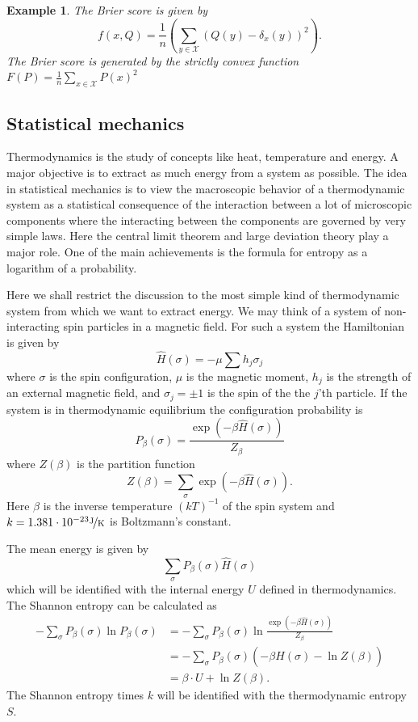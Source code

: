 \documentclass[10pt,a4paper,draft]{article}
\newtheorem{Example}{Example}
\begin{document}
\begin{Example}
The Brier score is given by 
\[
f\left(x,Q\right)=\frac{1}{n}\left(\sum_{y\in\mathcal{X}}\left(Q\left(y\right)-\delta_{x}\left(y\right)\right)^{2}\right).
\]
The Brier score is generated by the strictly convex function
$F\left(P\right)=\frac{1}{n}\sum_{x\in\mathcal{X}}P\left(x\right)^{2}$
\end{Example}

\subsection{Statistical mechanics}

Thermodynamics is the study of concepts like heat, temperature
and energy. A major objective is to extract as much energy from a
system as possible. The idea in statistical mechanics is to view the
macroscopic behavior of a thermodynamic system as a statistical consequence
of the interaction between a lot of microscopic components where
the interacting between the components are governed by very simple
laws. Here the central limit theorem and large deviation theory play a
major role. One of the main achievements is the formula for entropy as
a logarithm of a probability.

Here we shall restrict the discussion to the most simple kind of thermodynamic
system from which we want to extract energy. We may
think of a system of non-interacting spin particles in a magnetic
field. For such a system the Hamiltonian is given by 
\[
\hat{H}\left(\sigma\right)=-\mu\sum h_{j}\sigma_{j}
\]
where $\sigma$ is the spin configuration, $\mu$ is the magnetic
moment, $h_{j}$ is the strength of an external magnetic field, and
$\sigma_{j}=\pm1$
is the spin of the the $j$'th particle. If the system is in
thermodynamic equilibrium the configuration probability is
\[
P_{\beta}\left(\sigma\right)=\frac{\exp\left(-\beta
\hat{H}\left(\sigma\right)\right)}{Z_{\beta}}
\]
where $Z\left(\beta\right)$ is the partition function
\[
Z\left(\beta\right)=\sum_{\sigma}\exp\left(-\beta
\hat{H}\left(\sigma\right)\right).
\]
Here $\beta$ is the inverse temperature $\left(kT\right)^{-1}$
of the spin system and
$k=1.381\cdot10^{-23}\nicefrac{\unit{J}}{\unit{K}}$ is
Boltzmann's constant. 

The mean energy is given by 
\[
\sum_{\sigma}P_{\beta}\left(\sigma\right)\hat{H}\left(\sigma\right)
\]
which will be identified with the internal energy $U$ defined
in thermodynamics. The Shannon entropy can be calculated
as 
\begin{align*}
-\sum_{\sigma}P_{\beta}\left(\sigma\right)\ln
P_{\beta}\left(\sigma\right) &
=-\sum_{\sigma}P_{\beta}\left(\sigma\right)\ln\frac{\exp\left(-\beta
\hat{H}\left(\sigma\right)\right)}{Z_{\beta}}\\
& =-\sum_{\sigma}P_{\beta}\left(\sigma\right)\left(-\beta
\hat{H}\left(\sigma\right)-\ln Z\left(\beta\right)\right)\\
&
=\beta\cdot U +\ln
Z\left(\beta\right).
\end{align*}
The Shannon entropy times $k$  will be identified with the thermodynamic entropy $S$.
\end{document}
